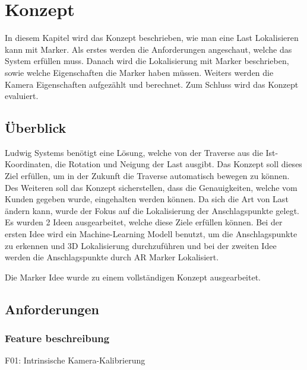 \section{Konzept}

In diesem Kapitel wird das Konzept beschrieben, wie man eine Last Lokalisieren kann mit Marker.
Als erstes werden die Anforderungen angeschaut, welche das System erfüllen muss. 
Danach wird die Lokalisierung mit Marker beschrieben, sowie welche Eigenschaften die Marker haben müssen.
Weiters werden die Kamera Eigenschaften aufgezählt und berechnet.
Zum Schluss wird das Konzept evaluiert.

\subsection{Überblick}
Ludwig Systems benötigt eine Lösung, welche von der Traverse aus die Ist-Koordinaten, die Rotation und Neigung der Last ausgibt. Das Konzept soll dieses Ziel erfüllen, um in der Zukunft die Traverse automatisch bewegen zu können. Des Weiteren soll das Konzept sicherstellen, dass die Genauigkeiten, welche vom Kunden gegeben wurde, eingehalten werden können. 
Da sich die Art von Last ändern kann, wurde der Fokus auf die Lokalisierung der Anschlagspunkte gelegt. 
Es wurden 2 Ideen ausgearbeitet, welche diese Ziele erfüllen können. Bei der ersten Idee wird ein Machine-Learning Modell benutzt, um die Anschlagspunkte zu erkennen und 3D Lokalisierung durchzuführen und bei der zweiten Idee werden die Anschlagspunkte durch AR Marker 
Lokalisiert.

Die Marker Idee wurde zu einem vollständigen Konzept ausgearbeitet.


\subsection{Anforderungen}
\label{sec:requirements}

\subsubsection{Feature beschreibung}


F01: Intrinsische Kamera-Kalibrierung

